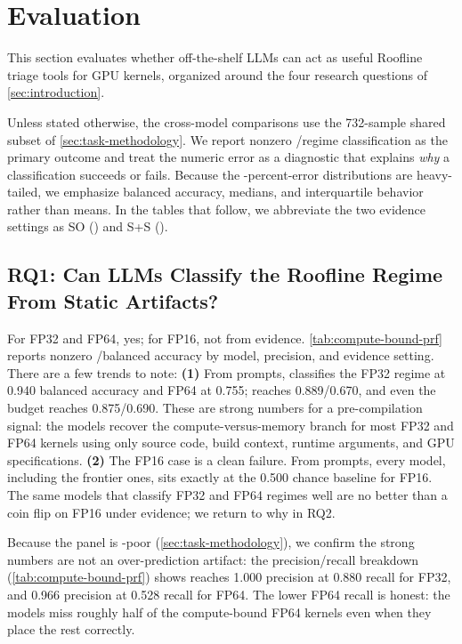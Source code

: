 \section{Evaluation}
\label{sec:results}

This section evaluates whether off-the-shelf LLMs can act as useful Roofline triage tools for GPU kernels, organized around the four research questions of \autoref{sec:introduction}.

Unless stated otherwise, the cross-model comparisons use the 732-sample shared subset of \autoref{sec:task-methodology}.
We report nonzero \bandwidthbound/\computebound regime classification as the primary outcome and treat the numeric \rai error as a diagnostic that explains \textit{why} a classification succeeds or fails.
Because the \rai-percent-error distributions are heavy-tailed, we emphasize balanced accuracy, medians, and interquartile behavior rather than means.
In the tables that follow, we abbreviate the two evidence settings as SO (\sourceonly) and S+S (\sourcesass).






\subsection{RQ1: Can LLMs Classify the Roofline Regime From Static Artifacts?}

For FP32 and FP64, yes; for FP16, not from \sourceonly evidence.
\autoref{tab:compute-bound-prf} reports nonzero \bandwidthbound/\computebound balanced accuracy by model, precision, and evidence setting.
There are a few trends to note:
\textbf{(1)} From \sourceonly prompts, \opus classifies the FP32 regime at 0.940 balanced accuracy and FP64 at 0.755; \gptfivefour reaches 0.889/0.670, and even the budget \gptoss reaches 0.875/0.690.
These are strong numbers for a pre-compilation signal: the models recover the compute-versus-memory branch for most FP32 and FP64 kernels using only source code, build context, runtime arguments, and GPU specifications.
\textbf{(2)} The FP16 case is a clean failure.
From \sourceonly prompts, every model, including the frontier ones, sits exactly at the 0.500 chance baseline for FP16.
The same models that classify FP32 and FP64 regimes well are no better than a coin flip on FP16 under \sourceonly evidence; we return to why in RQ2.

Because the panel is \computebound-poor (\autoref{sec:task-methodology}), we confirm the strong numbers are not an over-prediction artifact: the \computebound precision/recall breakdown (\autoref{tab:compute-bound-prf}) shows \sourceonly \opus reaches 1.000 \computebound precision at 0.880 recall for FP32, and 0.966 precision at 0.528 recall for FP64.
The lower FP64 recall is honest: the models miss roughly half of the compute-bound FP64 kernels even when they place the rest correctly.

